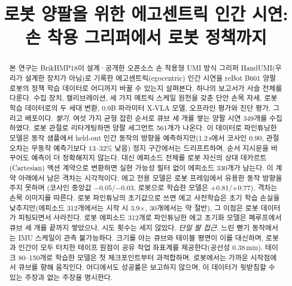\documentclass[conference,10pt]{IEEEtran}
\newcommand{\mm}{\,mm\xspace}
\begin{document}
\title{로봇 양팔을 위한 에고센트릭 인간 시연:\\손 착용 그리퍼에서 로봇 정책까지}
\author{
}
\maketitle

\begin{abstract}
본 연구는 BrikHMP18이 설계·공개한 오픈소스 손 착용형 UMI 방식 그리퍼 HandUMI(우리가 설계한 장치가 아님)로 기록한 에고센트릭(egocentric)
인간 시연을 reBot B601 양팔 로봇의 정책 학습 데이터로 어디까지 바꿀 수 있는지 살펴본다. 하나의 보고서가 사슬 전체를 다룬다. 수집
장치, 캘리브레이션, 세 가지 메트릭 스케일 원천을 갖춘 단안 손목 자세, 로봇 학습 데이터로의 두 세대 변환, 0.9B 파라미터 X-VLA 모델,
오프라인 평가와 진단 평가, 그리고 배포이다. \emph{쌓기.} 여섯 가지 균형 잡힌 순서로 큐브 세 개를 쌓는 양팔 시연 349개를 수집하였다.
로봇 관절로 리타게팅하면 양팔 세그먼트 561개가 나온다. 이 데이터로 파인튜닝한 모델은 동작 샘플에서 held-out 인간 동작의 방향을
예측하지만(1.2\,s에서 코사인 0.90, 관절 오차는 무동작 예측기보다 13--32\% 낮음) 정지 구간에서는 드리프트하며, 순서 지시문을 바꾸어도
예측이 더 정확해지지 않는다. 대신 에피소드 전체를 로봇 자신의 상대 데카르트(Cartesian) 액션 계약으로 변환하면 실현 가능성 필터 없이
에피소드 330개가 남는다. 이 계약 아래에서 남은 격차는 시각적이다. 에고 전용 모델은 로봇 프레임에서 유용한 동작 방향을 주지 못하며
(코사인 중앙값 $-0.05$/$-0.03$, 로봇으로 학습한 모델은 $+0.81$/$+0.77$), 격차는 손목 이미지를 따른다. 로봇 파인튜닝의 초기값으로 쓰면
에고 사전학습은 초기 학습 손실을 낮추지만(에피소드 312개에서는 시작 시 3.9$\times$, 30개에서는 약 절반), 그 이점은 로봇 데이터가
피팅되면서 사라진다. 로봇 에피소드 312개로 파인튜닝한 에고 초기화 모델은 폐루프에서 큐브 세 개를 끝까지 쌓았으나, 시도 횟수는
세지 않았다. \emph{단일 팔 접근.} 느린 뻗기 동작에서는 IMU 스케일이 관측 불가능하다. 크기를 아는 큐브와 테이블 평면이 이를
대신하며, 로봇과 인간이 모두 터치한 테이프 원점이 공유 작업 좌표계를 제공한다(공선성 0.38\mm). 테이크 80--150개로 학습한 모델은
첫 체크포인트부터 과적합하며, 로봇에서는 가까운 시작점에서 큐브를 향해 움직인다. 어디에서도 성공률은 보고하지 않으며, 이 데이터가
뒷받침할 수 있는 주장과 없는 주장을 명시한다.
\end{abstract}
\end{document}
